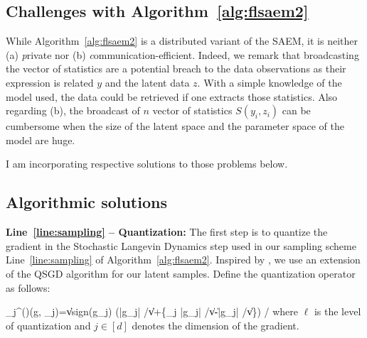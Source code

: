 \documentclass{article}
\begin{document}
\subsection{Challenges with Algorithm~\ref{alg:flsaem2}}
While Algorithm~\ref{alg:flsaem2} is a distributed variant of the SAEM, it is neither (a) \emph private nor (b) \emph communication-efficient.
Indeed, we remark that broadcasting the vector of statistics are a potential breach to the data observations as their expression is related $y$ and the latent data $z$. With a simple knowledge of the model used, the data could be retrieved if one extracts those statistics.
Also regarding (b), the broadcast of $n$ vector of statistics $S(y_i,z_i)$ can be cumbersome when the size of the latent space and the parameter space of the model are huge.

I am incorporating respective solutions to those problems below.

\subsection{Algorithmic solutions}

\textbf{Line~\ref{line:sampling} -- Quantization:} 
The first step is to quantize the gradient in the Stochastic Langevin Dynamics step used in our sampling scheme Line~\ref{line:sampling} of Algorithm~\ref{alg:flsaem2}.
Inspired by \citep{alistarh2017qsgd}, we use an extension of the QSGD algorithm for our latent samples.
Define the quantization operator as follows:

\beq\label{eq:operator}
_{j}^{(\ell)}\left(g, \xi_{j}\right)=\|v\| \cdot \textrm{sign}\left(g_{j}\right) \cdot\left(\left\lfloor \ell \left|g_{j}\right| /\|v\|\right\rfloor+\left\{\xi_{j} \leq \ell \left|g_{j}\right| /\|v\|-\left\lfloor \ell \left|g_{j}\right| /\|v\|\right\rfloor\right\}\right) /\ell
\eeq
where $\ell$ is the level of quantization and $j \in [d]$ denotes the dimension of the gradient.
\end{document}

